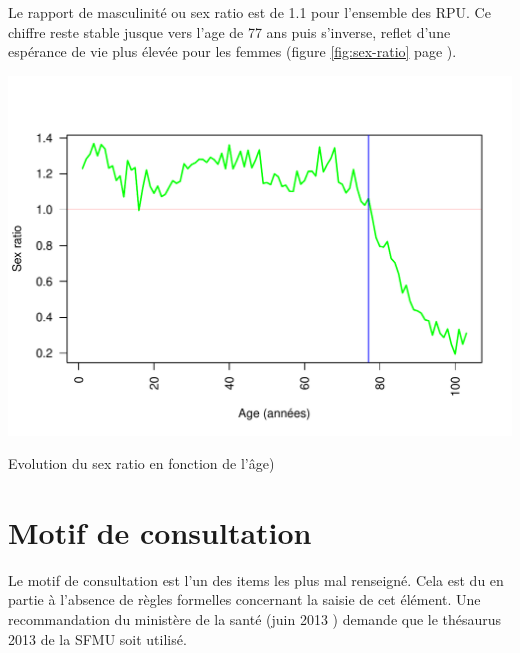 \documentclass[12pt,english,french,twoside]{book}\usepackage[]{graphicx}\usepackage[]{color}
\makeatletter
\def\maxwidth{ %
  \ifdim\Gin@nat@width>\linewidth
    \linewidth
  \else
    \Gin@nat@width
  \fi
}
\newenvironment{knitrout}{}{} %
\makeatother
\begin{document}
Le rapport de masculinité ou sex ratio est de 1.1 pour l'ensemble des RPU. Ce chiffre reste stable jusque vers l'age de 77 ans puis s'inverse, reflet d'une espérance de vie plus élevée pour les femmes (figure \ref{fig:sex-ratio} page \pageref{fig:sex-ratio}).

\begin{center}
\begin{knitrout}
\color{fgcolor}
\includegraphics[width=\maxwidth]{figure/sr_graphe} 

\end{knitrout}

\caption{Evolution du sex ratio en fonction de l'âge)}
\label{fig:sex-ratio}
\end{center}




\newpage
\chapter{Motif de consultation}



Le motif de consultation est l'un des items les plus mal renseigné. Cela est du en partie à l'absence de règles formelles concernant la saisie de cet élément. Une recommandation du ministère de la santé (juin 2013 \cite{12,13}) demande que le thésaurus 2013 de la SFMU \cite{9} soit utilisé.
\end{document}
